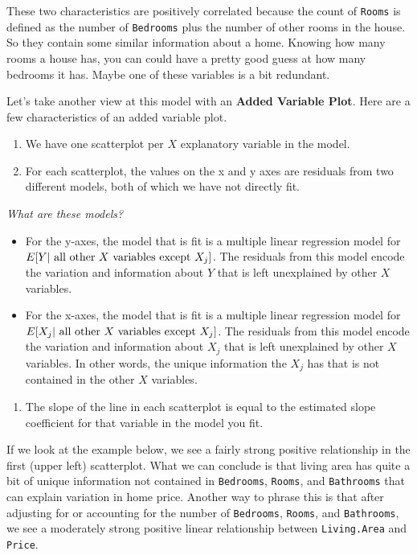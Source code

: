 \documentclass[
]{book}
\providecommand{\tightlist}{%
  \setlength{\itemsep}{0pt}\setlength{\parskip}{0pt}}
\begin{document}
These two characteristics are positively correlated because the count of \texttt{Rooms} is defined as the number of \texttt{Bedrooms} plus the number of other rooms in the house. So they contain some similar information about a home. Knowing how many rooms a house has, you can could have a pretty good guess at how many bedrooms it has. Maybe one of these variables is a bit redundant.

Let's take another view at this model with an \textbf{Added Variable Plot}. Here are a few characteristics of an added variable plot.

\begin{enumerate}
\def\labelenumi{\arabic{enumi}.}
\tightlist
\item
  We have one scatterplot per \(X\) explanatory variable in the model.
\item
  For each scatterplot, the values on the x and y axes are residuals from two different models, both of which we have not directly fit.
\end{enumerate}

\emph{What are these models?}

\begin{itemize}
\tightlist
\item
  For the y-axes, the model that is fit is a multiple linear regression model for \(E[Y |\hbox{ all other }X\hbox{ variables except }X_j]\). The residuals from this model encode the variation and information about \(Y\) that is left unexplained by other \(X\) variables.
\item
  For the x-axes, the model that is fit is a multiple linear regression model for \(E[X_j | \hbox{ all other }X\hbox{ variables except }X_j]\). The residuals from this model encode the variation and information about \(X_j\) that is left unexplained by other \(X\) variables. In other words, the unique information the \(X_j\) has that is not contained in the other \(X\) variables.
\end{itemize}

\begin{enumerate}
\def\labelenumi{\arabic{enumi}.}
\setcounter{enumi}{2}
\tightlist
\item
  The slope of the line in each scatterplot is equal to the estimated slope coefficient for that variable in the model you fit.
\end{enumerate}

If we look at the example below, we see a fairly strong positive relationship in the first (upper left) scatterplot. What we can conclude is that living area has quite a bit of unique information not contained in \texttt{Bedrooms}, \texttt{Rooms}, and \texttt{Bathrooms} that can explain variation in home price. Another way to phrase this is that after adjusting for or accounting for the number of \texttt{Bedrooms}, \texttt{Rooms}, and \texttt{Bathrooms}, we see a moderately strong positive linear relationship between \texttt{Living.Area} and \texttt{Price}.
\end{document}
